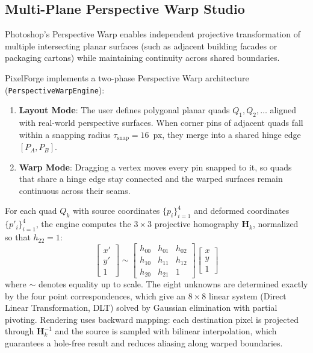 \documentclass[10pt,journal,compsoc]{IEEEtran}
\begin{document}
\subsection{Multi-Plane Perspective Warp Studio}
Photoshop's Perspective Warp enables independent projective transformation of multiple intersecting planar surfaces (such as adjacent building facades or packaging cartons) while maintaining continuity across shared boundaries.

PixelForge implements a two-phase Perspective Warp architecture (\texttt{PerspectiveWarpEngine}):
\begin{enumerate}
    \item \textbf{Layout Mode}: The user defines polygonal planar quads $Q_1, Q_2, \dots$ aligned with real-world perspective surfaces. When corner pins of adjacent quads fall within a snapping radius $\tau_{\text{snap}} = 16$~px, they merge into a shared hinge edge $[P_A, P_B]$.
    \item \textbf{Warp Mode}: Dragging a vertex moves every pin snapped to it, so quads that share a hinge edge stay connected and the warped surfaces remain continuous across their seams.
\end{enumerate}

For each quad $Q_k$ with source coordinates $\{p_i\}_{i=1}^4$ and deformed coordinates $\{p'_i\}_{i=1}^4$, the engine computes the $3\times 3$ projective homography $\mathbf{H}_k$, normalized so that $h_{22} = 1$:
\begin{equation}
\begin{bmatrix} x' \\ y' \\ 1 \end{bmatrix} \sim \begin{bmatrix} h_{00} & h_{01} & h_{02} \\ h_{10} & h_{11} & h_{12} \\ h_{20} & h_{21} & 1 \end{bmatrix} \begin{bmatrix} x \\ y \\ 1 \end{bmatrix}
\end{equation}
where $\sim$ denotes equality up to scale. The eight unknowns are determined exactly by the four point correspondences, which give an $8 \times 8$ linear system (Direct Linear Transformation, DLT) solved by Gaussian elimination with partial pivoting. Rendering uses backward mapping: each destination pixel is projected through $\mathbf{H}_k^{-1}$ and the source is sampled with bilinear interpolation, which guarantees a hole-free result and reduces aliasing along warped boundaries.
\end{document}
